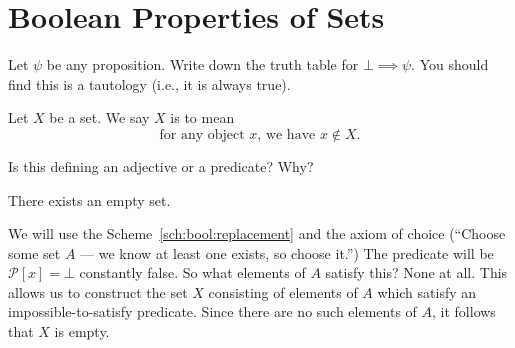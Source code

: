 \section{Boolean Properties of Sets}

\begin{xca}
Let $\psi$ be any proposition. Write down the truth table for
$\bot\implies\psi$. You should find this is a tautology (i.e., it is
always true).
\end{xca}

\begin{definition}
Let $X$ be a set. We say $X$ is  to mean
\begin{equation}\label{eq:bool:def:empty}
\mbox{for any object $x$, we have }x\notin X.
\end{equation}
\end{definition}

\begin{xca}\label{xca:bool:empty-is-adjective}
Is this defining an adjective or a predicate? Why?
\end{xca}

\begin{proposition}\label{prop:bool:existence-of-empty-set}
There exists an empty set.
\end{proposition}

We will use the Scheme~\ref{sch:bool:replacement} and the axiom of
choice (``Choose some set $A$ --- we know at least one exists, so choose
it.'') The predicate will be $\mathcal{P}[x]=\bot$ constantly false. So
what elements of $A$ satisfy this? None at all. This allows us to
construct the set $X$ consisting of elements of $A$ which satisfy an
impossible-to-satisfy predicate. Since there are no such elements of $A$,
it follows that $X$ is empty.

